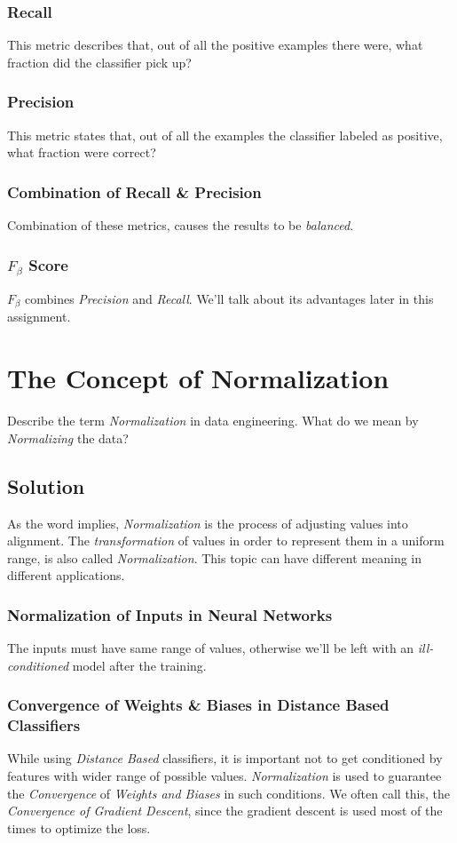 \documentclass[12pt]{article}
\numberwithin{equation}{section}
\numberwithin{table}{section}
\numberwithin{figure}{section}
\begin{document}
\subsubsection*{Recall}
This metric describes that, out of all the positive examples there were, what fraction did the classifier pick up?

\subsubsection*{Precision}
This metric states that, out of all the examples the classifier labeled as positive, what fraction were correct?

\subsubsection*{Combination of Recall \& Precision}
Combination of these metrics, causes the results to be \textit{balanced}.

\subsubsection*{$F_{\beta}$ Score}
$F_{\beta}$ combines \textit{Precision} and \textit{Recall}. We'll talk about its advantages later in this assignment.

\section{The Concept of Normalization}
Describe the term \textit{Normalization} in data engineering. What do we mean by \textit{Normalizing} the data?
\subsection*{Solution}
As the word implies, \textit{Normalization} is the process of adjusting values into alignment. The \textit{transformation} of values in order to represent them in a uniform range, is also called \textit{Normalization}. This topic can have different meaning in different applications.
\subsubsection*{Normalization of Inputs in Neural Networks}
The inputs must have same range of values, otherwise we'll be left with an \textit{ill-conditioned} model after the training.

\subsubsection*{Convergence of Weights \& Biases in Distance Based Classifiers}
While using \textit{Distance Based} classifiers, it is important not to get conditioned by features with wider range of possible values. \textit{Normalization} is used to guarantee the \textit{Convergence} of \textit{Weights and Biases} in such conditions. We often call this, the \textit{Convergence of Gradient Descent}, since the gradient descent is used most of the times to optimize the loss.
\end{document}
